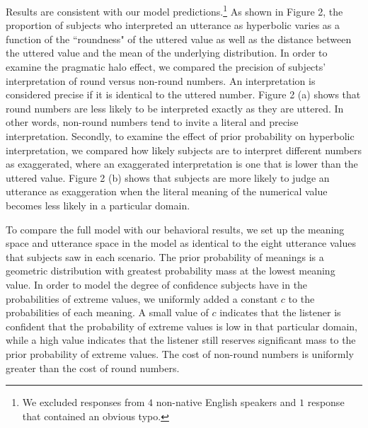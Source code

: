 \documentclass{article} %
\begin{document}
Results are consistent with our model predictions.\footnote[1]{We excluded responses from $4$ non-native English speakers and $1$ response that contained an obvious typo.} As shown in Figure 2, the proportion of subjects who interpreted an utterance as hyperbolic varies as a function of the ``roundness" of the uttered value as well as the distance between the uttered value and the mean of the underlying distribution. In order to examine the pragmatic halo effect, we compared the precision of subjects' interpretation of round versus non-round numbers. An interpretation is considered precise if it is identical to the uttered number. Figure 2 (a) shows that round numbers are less likely to be interpreted exactly as they are uttered. In other words, non-round numbers tend to invite a literal and precise interpretation. Secondly, to examine the effect of prior probability on hyperbolic interpretation, we compared how likely subjects are to interpret different numbers as exaggerated, where an exaggerated interpretation is one that is lower than the uttered value. Figure 2 (b) shows that subjects are more likely to judge an utterance as exaggeration when the literal meaning of the numerical value becomes less likely in a particular domain. 



To compare the full model with our behavioral results, we set up the meaning space and utterance space in the model as identical to the eight utterance values that subjects saw in each scenario. The prior probability of meanings is a geometric distribution with greatest probability mass at the lowest meaning value. In order to model the degree of confidence subjects have in the probabilities of extreme values, we uniformly added a constant $c$ to the probabilities of each meaning. A small value of $c$ indicates that the listener is confident that the probability of extreme values is low in that particular domain, while a high value indicates that the listener still reserves significant mass to the prior probability of extreme values. The cost of non-round numbers is uniformly greater than the cost of round numbers. 
\end{document}
